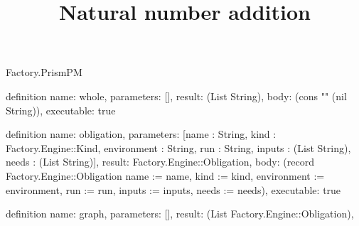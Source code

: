 \begin{lexlean}{Factory.PrismPM}
\title{Natural number addition}
\begin{semanticmodule}
definition{
  name: whole,
  parameters: [],
  result: (List String),
  body: (cons "" (nil String)),
  executable: true
}

definition{
  name: obligation,
  parameters: [name : String, kind : Factory.Engine::Kind, environment : String, run : String, inputs : (List String), needs : (List String)],
  result: Factory.Engine::Obligation,
  body: (record Factory.Engine::Obligation {name := name, kind := kind, environment := environment, run := run, inputs := inputs, needs := needs}),
  executable: true
}

definition{
  name: graph,
  parameters: [],
  result: (List Factory.Engine::Obligation),
}
\end{semanticmodule}
\end{lexlean}

